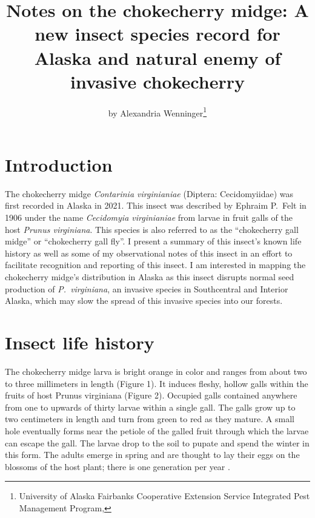 \title{Notes on the chokecherry midge: A new insect species record for Alaska and natural enemy of invasive chokecherry}

\author{by Alexandria Wenninger\footnote{University of Alaska Fairbanks Cooperative Extension Service Integrated Pest Management Program, }}

\maketitle

\section{Introduction}

The chokecherry midge \textit{Contarinia virginianiae} (Diptera: Cecidomyiidae) was first recorded in Alaska in 2021. This insect was described by Ephraim P.\ Felt in 1906 under the name \textit{Cecidomyia virginianiae} from larvae in fruit galls of the host \textit{Prunus virginiana}. This species is also referred to as the ``chokecherry gall midge'' or ``chokecherry gall fly''. I present a summary of this insect's known life history as well as some of my observational notes of this insect in an effort to facilitate recognition and reporting of this insect. I am interested in mapping the chokecherry midge's distribution in Alaska as this insect disrupts normal seed production of \textit{P.\ virginiana}, an invasive species in Southcentral and Interior Alaska, which may slow the spread of this invasive species into our forests. 

\section{Insect life history}

The chokecherry midge larva is bright orange in color and ranges from about two to three millimeters in length (Figure 1). It induces fleshy, hollow galls within the fruits of host Prunus virginiana (Figure 2). Occupied galls contained anywhere from one to upwards of thirty larvae within a single gall. The galls grow up to two centimeters in length and turn from green to red as they mature. A small hole eventually forms near the petiole of the galled fruit through which the larvae can escape the gall. The larvae drop to the soil to pupate and spend the winter in this form. The adults emerge in spring and are thought to lay their eggs on the blossoms of the host plant; there is one generation per year \citep{Cranshaw2004}. 


